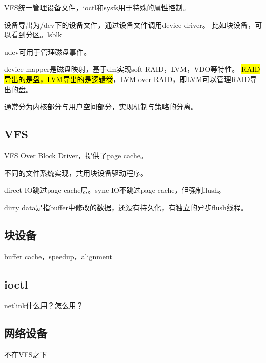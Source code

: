 VFS统一管理设备文件，ioctl和sysfs用于特殊的属性控制。

设备导出为/dev下的设备文件，通过设备文件调用device driver。
比如块设备，可以看到分区。lsblk

udev可用于管理磁盘事件。

device mapper是磁盘映射，基于dm实现soft RAID，LVM，VDO等特性。
\hl{RAID导出的是盘，LVM导出的是逻辑卷}，LVM over RAID，即LVM可以管理RAID导出的盘。

通常分为内核部分与用户空间部分，实现机制与策略的分离。

\subsection{VFS}

VFS Over Block Driver，提供了page cache。

不同的文件系统实现，共用块设备驱动程序。

direct IO跳过page cache层。sync IO不跳过page cache，但强制flush。

dirty data是指buffer中修改的数据，还没有持久化，有独立的异步flush线程。

\subsection{块设备}

buffer cache，speedup，alignment

\subsection{ioctl}

netlink什么用？怎么用？

\subsection{网络设备}

不在VFS之下
